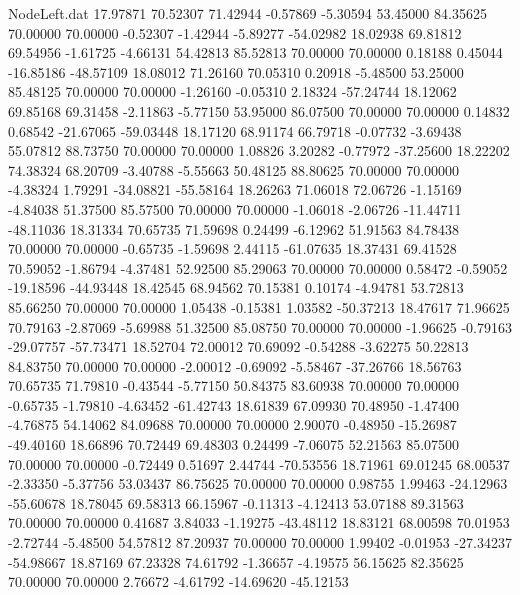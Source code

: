 \begin{filecontents}{NodeLeft.dat}
  17.97871   70.52307   71.42944    -0.57869   -5.30594   53.45000   84.35625   70.00000   70.00000   -0.52307   -1.42944   -5.89277  -54.02982
  18.02938   69.81812   69.54956    -1.61725   -4.66131   54.42813   85.52813   70.00000   70.00000    0.18188    0.45044  -16.85186  -48.57109
  18.08012   71.26160   70.05310     0.20918   -5.48500   53.25000   85.48125   70.00000   70.00000   -1.26160   -0.05310    2.18324  -57.24744
  18.12062   69.85168   69.31458    -2.11863   -5.77150   53.95000   86.07500   70.00000   70.00000    0.14832    0.68542  -21.67065  -59.03448
  18.17120   68.91174   66.79718    -0.07732   -3.69438   55.07812   88.73750   70.00000   70.00000    1.08826    3.20282   -0.77972  -37.25600
  18.22202   74.38324   68.20709    -3.40788   -5.55663   50.48125   88.80625   70.00000   70.00000   -4.38324    1.79291  -34.08821  -55.58164
  18.26263   71.06018   72.06726    -1.15169   -4.84038   51.37500   85.57500   70.00000   70.00000   -1.06018   -2.06726  -11.44711  -48.11036
  18.31334   70.65735   71.59698     0.24499   -6.12962   51.91563   84.78438   70.00000   70.00000   -0.65735   -1.59698    2.44115  -61.07635
  18.37431   69.41528   70.59052    -1.86794   -4.37481   52.92500   85.29063   70.00000   70.00000    0.58472   -0.59052  -19.18596  -44.93448
  18.42545   68.94562   70.15381     0.10174   -4.94781   53.72813   85.66250   70.00000   70.00000    1.05438   -0.15381    1.03582  -50.37213
  18.47617   71.96625   70.79163    -2.87069   -5.69988   51.32500   85.08750   70.00000   70.00000   -1.96625   -0.79163  -29.07757  -57.73471
  18.52704   72.00012   70.69092    -0.54288   -3.62275   50.22813   84.83750   70.00000   70.00000   -2.00012   -0.69092   -5.58467  -37.26766
  18.56763   70.65735   71.79810    -0.43544   -5.77150   50.84375   83.60938   70.00000   70.00000   -0.65735   -1.79810   -4.63452  -61.42743
  18.61839   67.09930   70.48950    -1.47400   -4.76875   54.14062   84.09688   70.00000   70.00000    2.90070   -0.48950  -15.26987  -49.40160
  18.66896   70.72449   69.48303     0.24499   -7.06075   52.21563   85.07500   70.00000   70.00000   -0.72449    0.51697    2.44744  -70.53556
  18.71961   69.01245   68.00537    -2.33350   -5.37756   53.03437   86.75625   70.00000   70.00000    0.98755    1.99463  -24.12963  -55.60678
  18.78045   69.58313   66.15967    -0.11313   -4.12413   53.07188   89.31563   70.00000   70.00000    0.41687    3.84033   -1.19275  -43.48112
  18.83121   68.00598   70.01953    -2.72744   -5.48500   54.57812   87.20937   70.00000   70.00000    1.99402   -0.01953  -27.34237  -54.98667
  18.87169   67.23328   74.61792    -1.36657   -4.19575   56.15625   82.35625   70.00000   70.00000    2.76672   -4.61792  -14.69620  -45.12153

\end{filecontents}
